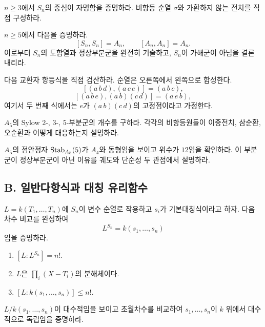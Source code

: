 \begin{exercise}
$n\ge3$에서 $S_n$의 중심이 자명함을 증명하라. 비항등 순열 $\sigma$와 가환하지 않는 전치를 직접 구성하라.
\end{exercise}

\begin{exercise}[*]
$n\ge5$에서 다음을 증명하라.
\[
  [S_n,S_n]=A_n,
  \qquad
  [A_n,A_n]=A_n.
\]
이로부터 $S_n$의 도함열과 정상부분군을 완전히 기술하고, $S_n$이 가해군이 아님을 결론 내리라.
\end{exercise}

\begin{exercise}
다음 교환자 항등식을 직접 검산하라. 순열은 오른쪽에서 왼쪽으로 합성한다.
\[
  [(a\,b\,d),(a\,c\,e)]=(a\,b\,c),
\]
\[
  [(a\,b\,e),(a\,b)(c\,d)]=(a\,e\,b),
\]
여기서 두 번째 식에서는 $e$가 $(a\,b)(c\,d)$의 고정점이라고 가정한다.
\end{exercise}

\begin{exercise}[*]
$A_5$의 Sylow $2$-, $3$-, $5$-부분군의 개수를 구하라. 각각의 비항등원들이 이중전치, 삼순환, 오순환과 어떻게 대응하는지 설명하라.
\end{exercise}

\begin{exercise}
$A_5$의 점안정자 $\operatorname{Stab}_{A_5}(5)$가 $A_4$와 동형임을 보이고 위수가 $12$임을 확인하라. 이 부분군이 정상부분군이 아닌 이유를 궤도와 단순성 두 관점에서 설명하라.
\end{exercise}

\subsection*{B. 일반다항식과 대칭 유리함수}

\begin{exercise}[*]
$L=k(T_1,\dots,T_n)$에 $S_n$이 변수 순열로 작용하고 $s_i$가 기본대칭식이라고 하자. 다음 차수 비교를 완성하여
\[
  L^{S_n}=k(s_1,\dots,s_n)
\]
임을 증명하라.
\begin{enumerate}[label=(\alph*)]
  \item $[L:L^{S_n}]=n!$.
  \item $L$은 $\prod_i(X-T_i)$의 분해체이다.
  \item $[L:k(s_1,\dots,s_n)]\le n!$.
\end{enumerate}
\end{exercise}

\begin{exercise}
$L/k(s_1,\dots,s_n)$이 대수적임을 보이고 초월차수를 비교하여 $s_1,\dots,s_n$이 $k$ 위에서 대수적으로 독립임을 증명하라.
\end{exercise}

